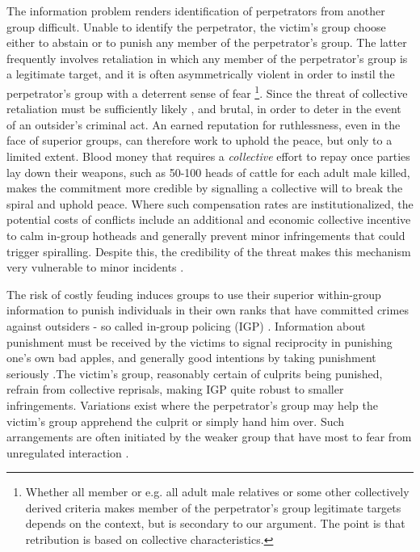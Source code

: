 The information problem renders identification of perpetrators from another
group difficult. Unable to identify the perpetrator, the victim's group choose
either to abstain or to punish any member of the perpetrator's group. The latter
frequently involves retaliation in which any member of the perpetrator's group
is a legitimate target, and it is often asymmetrically violent in order to
instil the perpetrator's group with a deterrent sense of fear \footnote{ Whether
	all member or e.g. all adult male relatives or some other collectively
derived criteria makes member of the perpetrator’s group legitimate targets
depends on the context, but is secondary to our argument. The point is that
retribution is based on collective characteristics.}. Since the threat of
collective retaliation must be sufficiently likely , and brutal, in order to
deter in the event of an outsider's criminal act. An earned reputation for
ruthlessness, even in the face of superior groups, can therefore work to uphold
the peace, but only to a limited extent. Blood money that requires a
\textit{collective} effort to repay once parties lay down their weapons, such as
50-100 heads of cattle for each adult male killed, makes the commitment more
credible by signalling a collective will to break the spiral and uphold peace.
Where such compensation rates are institutionalized, the potential costs of
conflicts include an additional and economic collective incentive to calm
in-group hotheads and generally prevent minor infringements that could trigger
spiralling. Despite this, the credibility of the threat makes this mechanism
very vulnerable to minor incidents \citep{Fearon_1996}.

The risk of costly feuding induces groups to use their superior within-group
information to punish individuals in their own ranks that have committed crimes
against outsiders - so called in-group policing (IGP) \citep[723]{Fearon_1996}.
Information about punishment must be received by the victims to signal
reciprocity in punishing one’s own bad apples, and generally good intentions by
taking punishment seriously \citep{Fearon_1996}.The victim’s group, reasonably
certain of culprits being punished, refrain from collective reprisals, making
IGP quite robust to smaller infringements. Variations exist where the
perpetrator’s group may help the victim’s group apprehend the culprit or simply
hand him over. Such arrangements are often initiated by the weaker group that
have most to fear from unregulated interaction \citep[50]{Lake_1996}. 


